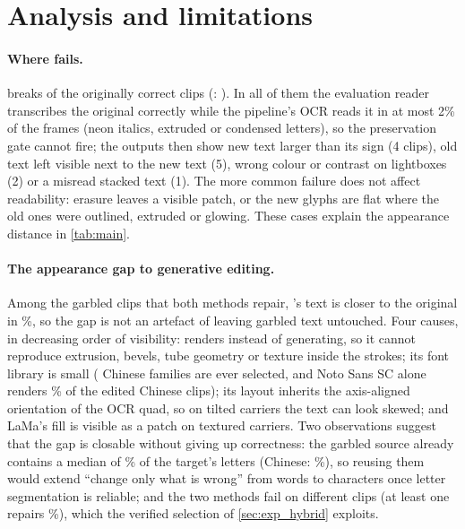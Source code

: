 \section{Analysis and limitations}
\label{sec:analysis}

\paragraph{Where \method fails.}
\label{sec:failures}
\method breaks \rOursBroken{} of the \rOrigCorrect{} originally correct clips (\steer: \rSteerBroken). In all of them the evaluation reader transcribes the original correctly while the pipeline's OCR reads it in at most 2\% of the frames (neon italics, extruded or condensed letters), so the preservation gate cannot fire; the outputs then show new text larger than its sign (4 clips), old text left visible next to the new text (5), wrong colour or contrast on lightboxes (2) or a misread stacked text (1). The more common failure does not affect readability: erasure leaves a visible patch, or the new glyphs are flat where the old ones were outlined, extruded or glowing. These cases explain the appearance distance in \cref{tab:main}.

\paragraph{The appearance gap to generative editing.}
\label{sec:limits}
Among the \rBothRepairN{} garbled clips that both methods repair, \steer's text is closer to the original in \rSteerCloserPct\%, so the gap is not an artefact of \steer leaving garbled text untouched. Four causes, in decreasing order of visibility: \method renders instead of generating, so it cannot reproduce extrusion, bevels, tube geometry or texture inside the strokes; its font library is small (\rZhFam{} Chinese families are ever selected, and Noto Sans SC alone renders \rNotoPct\% of the edited Chinese clips); its layout inherits the axis-aligned orientation of the OCR quad, so on tilted carriers the text can look skewed; and LaMa's fill is visible as a patch on textured carriers. Two observations suggest that the gap is closable without giving up correctness: the garbled source already contains a median of \rCharsEn\% of the target's letters (Chinese: \rCharsZh\%), so reusing them would extend ``change only what is wrong'' from words to characters once letter segmentation is reliable; and the two methods fail on different clips (at least one repairs \rAtLeastOne\%), which the verified selection of \cref{sec:exp_hybrid} exploits.

